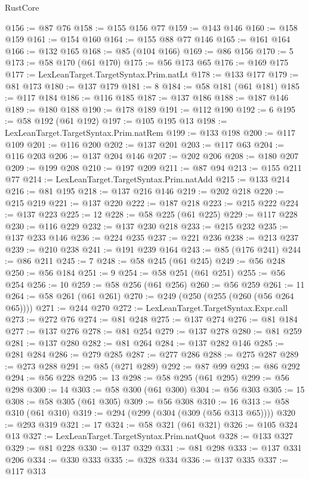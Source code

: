 \begin{lexlean}{RustCore}
\begin{coremodule}
@156 := @87 @76
@158 := @155 @156 @77
@159 := @143 @146
@160 := @158 @159
@161 := @154 @160
@164 := @155 @88 @77 @146
@165 := @161 @164
@166 := @132 @165
@168 := @85 (@104 @166)
@169 := @86 @156
@170 := 5
@173 := @58 @170 (@61 @170)
@175 := @56 @173 @65
@176 := @169 @175
@177 := LexLeanTarget.TargetSyntax.Prim.natLt
@178 := @133 @177
@179 := @81 @173
@180 := @137 @179
@181 := 8
@184 := @58 @181 (@61 @181)
@185 := @117 @184
@186 := @116 @185
@187 := @137 @186
@188 := @187 @146
@189 := @180 @188
@190 := @178 @189
@191 := @112 @190
@192 := 6
@195 := @58 @192 (@61 @192)
@197 := @105 @195 @13
@198 := LexLeanTarget.TargetSyntax.Prim.natRem
@199 := @133 @198
@200 := @117 @109
@201 := @116 @200
@202 := @137 @201
@203 := @117 @63
@204 := @116 @203
@206 := @137 @204 @146
@207 := @202 @206
@208 := @180 @207
@209 := @199 @208
@210 := @197 @209
@211 := @87 @94
@213 := @155 @211 @77
@214 := LexLeanTarget.TargetSyntax.Prim.natAdd
@215 := @133 @214
@216 := @81 @195
@218 := @137 @216 @146
@219 := @202 @218
@220 := @215 @219
@221 := @137 @220
@222 := @187 @218
@223 := @215 @222
@224 := @137 @223
@225 := 12
@228 := @58 @225 (@61 @225)
@229 := @117 @228
@230 := @116 @229
@232 := @137 @230 @218
@233 := @215 @232
@235 := @137 @233 @146
@236 := @224 @235
@237 := @221 @236
@238 := @213 @237
@239 := @210 @238
@241 := @191 @239 @164
@243 := @85 (@176 @241)
@244 := @86 @211
@245 := 7
@248 := @58 @245 (@61 @245)
@249 := @56 @248
@250 := @56 @184
@251 := 9
@254 := @58 @251 (@61 @251)
@255 := @56 @254
@256 := 10
@259 := @58 @256 (@61 @256)
@260 := @56 @259
@261 := 11
@264 := @58 @261 (@61 @261)
@270 := @249 (@250 (@255 (@260 (@56 @264 @65))))
@271 := @244 @270
@272 := LexLeanTarget.TargetSyntax.Expr.call
@273 := @272 @76
@274 := @81 @248
@275 := @137 @274
@276 := @81 @184
@277 := @137 @276
@278 := @81 @254
@279 := @137 @278
@280 := @81 @259
@281 := @137 @280
@282 := @81 @264
@284 := @137 @282 @146
@285 := @281 @284
@286 := @279 @285
@287 := @277 @286
@288 := @275 @287
@289 := @273 @288
@291 := @85 (@271 @289)
@292 := @87 @99
@293 := @86 @292
@294 := @56 @228
@295 := 13
@298 := @58 @295 (@61 @295)
@299 := @56 @298
@300 := 14
@303 := @58 @300 (@61 @300)
@304 := @56 @303
@305 := 15
@308 := @58 @305 (@61 @305)
@309 := @56 @308
@310 := 16
@313 := @58 @310 (@61 @310)
@319 := @294 (@299 (@304 (@309 (@56 @313 @65))))
@320 := @293 @319
@321 := 17
@324 := @58 @321 (@61 @321)
@326 := @105 @324 @13
@327 := LexLeanTarget.TargetSyntax.Prim.natQuot
@328 := @133 @327
@329 := @81 @228
@330 := @137 @329
@331 := @81 @298
@333 := @137 @331 @206
@334 := @330 @333
@335 := @328 @334
@336 := @137 @335
@337 := @117 @313

\end{coremodule}
\end{lexlean}
